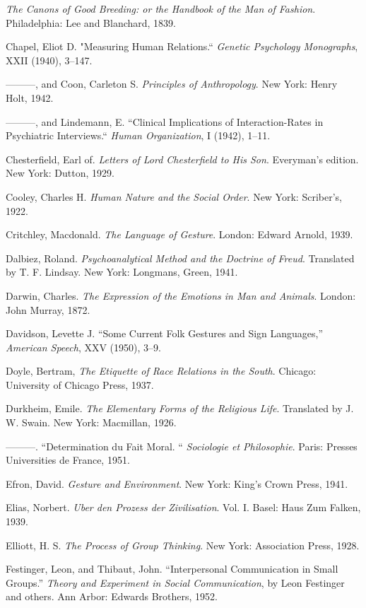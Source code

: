 \documentclass[openany,nobib]{tufte-book}
\begin{document}
\begin{hangparas}{.25in}{1}
\emph{The Canons of Good Breeding: or the Handbook of the Man of
Fashion}. Philadelphia: Lee and Blanchard, 1839.

Chapel, Eliot D. "Measuring Human Relations.`` \emph{Genetic Psychology
Monographs}, XXII (1940), 3--147.

---------, and Coon, Carleton S. \emph{Principles of Anthropology}. New
York: Henry Holt, 1942.

---------, and Lindemann, E. ``Clinical Implications of
Interaction-Rates in Psychiatric Interviews.`` \emph{Human
Organization}, I (1942), 1--11.

Chesterfield, Earl of. \emph{Letters of Lord Chesterfield to His Son}.
Everyman's edition. New York: Dutton, 1929.

Cooley, Charles H. \emph{Human Nature and the Social Order}. New York:
Scriber's, 1922.

Critchley, Macdonald. \emph{The Language of Gesture}. London: Edward
Arnold, 1939.

Dalbiez, Roland. \emph{Psychoanalytical Method and the Doctrine of
Freud}. Translated by T. F. Lindsay. New York: Longmans, Green, 1941.

Darwin, Charles. \emph{The Expression of the Emotions in Man and
Animals}. London: John Murray, 1872.

Davidson, Levette J. ``Some Current Folk Gestures and Sign Languages,''
\emph{American Speech}, XXV (1950), 3--9.

Doyle, Bertram, \emph{The Etiquette of Race Relations in the South}.
Chicago: University of Chicago Press, 1937.

Durkheim, Emile. \emph{The Elementary Forms of the Religious Life}.
Translated by J. W. Swain. New York: Macmillan, 1926.

---------. ``Determination du Fait Moral. `` \emph{Sociologie et
Philosophie}. Paris: Presses Universities de France, 1951.

Efron, David. \emph{Gesture and Environment}. New York: King's Crown
Press, 1941.

Elias, Norbert. \emph{Uber den Prozess der Zivilisation}. Vol. I. Basel:
Haus Zum Falken, 1939.

Elliott, H. S. \emph{The Process of Group Thinking}. New York:
Association Press, 1928.

Festinger, Leon, and Thibaut, John. ``Interpersonal Communication in
Small Groups.'' \emph{Theory and Experiment in Social Communication}, by
Leon Festinger and others. Ann Arbor: Edwards Brothers, 1952.


\end{hangparas}
\end{document}
